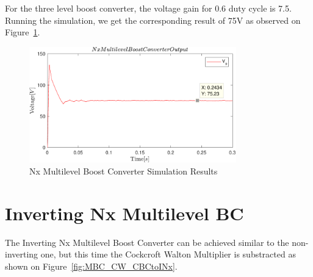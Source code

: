 \vspace{-4mm}
For the three level boost converter, the voltage gain for 0.6 duty cycle is 7.5. Running the simulation, we get the corresponding result of 75V as observed on Figure~\ref{fig:MBC_SimResults}.
\vspace{-2mm}
\begin{figure}[H]
   \centering
   \includegraphics[width=0.8\textwidth]{figures/yMultilevel/Non-invertingNx.pdf}
    \caption{Nx Multilevel Boost Converter Simulation Results}
	\label{fig:MBC_SimResults}
\end{figure}

\section{Inverting Nx Multilevel BC}\label{ch:IMBC}

The Inverting Nx Multilevel Boost Converter can be achieved similar to the non-inverting one, but this time the Cockcroft Walton Multiplier is substracted as shown on Figure~\ref{fig:MBC_CW_CBCtoINx}. \cite{Bhaskar2016}


